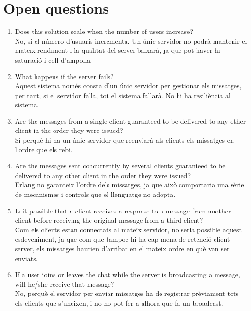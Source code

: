 \documentclass[a4paper, 10pt]{article}
\begin{document}
\section{Open questions}
\begin{enumerate}
\item
Does this solution scale when the number of users increase? \\
No, si el número d’usuaris incrementa. Un únic servidor no podrà mantenir el mateix rendiment i la qualitat del servei baixarà, ja que pot haver-hi saturació i coll d’ampolla.
 \item
 What happens if the server fails?\\
Aquest sistema només consta d'un únic servidor per gestionar els missatges, per tant, si el servidor falla, tot el sistema fallarà. No hi ha resiliència al sistema.

\item
Are the messages from a single client guaranteed to be delivered to any other client in the order they were issued? \\
 Sí perquè hi ha un únic servidor que reenviarà als clients els missatges en l’ordre que els rebi. 
 
\item Are the messages sent concurrently by several clients guaranteed to be delivered to any other client in the order they were issued?\\ 	 	 	
Erlang no garanteix l’ordre dels missatges, ja que això comportaria una sèrie de mecanismes i controls que el llenguatge no adopta.

\item Is it possible that a client receives a response to a message from another client before receiving the original message from a third client?\\
Com els clients estan connectats al mateix servidor, no seria possible aquest esdeveniment, ja que com que tampoc hi ha cap mena de retenció client-server, els missatges haurien d'arribar en el mateix ordre en què van ser enviats.

\item If a user joins or leaves the chat while the server is broadcasting a message, will he/she receive that message?\\
No, perquè el servidor per enviar missatges ha de registrar prèviament tots els clients que s'uneixen, i no ho pot fer a alhora que fa un broadcast.
\end{enumerate}
\newpage
\end{document}
